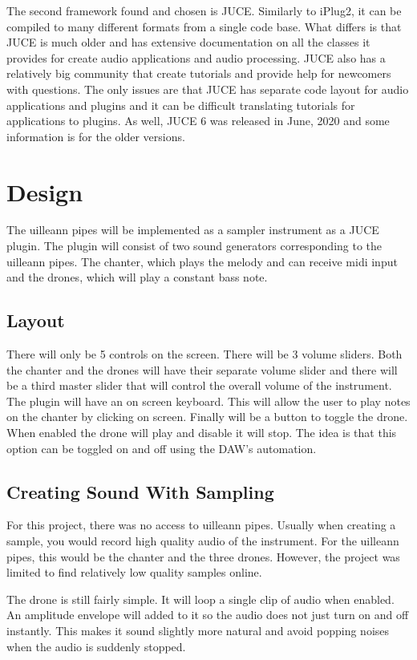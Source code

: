 \documentclass[12pt]{article}
\begin{document}
	The second framework found and chosen is JUCE. Similarly to iPlug2, it can be compiled to many different formats from a 
	single code base. What differs is that JUCE is much older and has extensive documentation on all the classes it provides
	for create audio applications and audio processing. JUCE also has a relatively big community that create tutorials and provide
	help for newcomers with questions. The only issues are that JUCE has separate code layout for audio applications and plugins
	and it can be difficult translating tutorials for applications to plugins. As well, JUCE 6 was released in June, 2020 and 
	some information is for the older versions.
	
		
\section{Design}
	The uilleann pipes will be implemented as a sampler instrument as a JUCE plugin. The plugin will consist of two sound 
	generators corresponding to the uilleann pipes. The chanter, which plays the melody and can receive midi input and the
	drones, which will play a constant bass note.
	
	\subsection{Layout}
	There will only be 5 controls on the screen. There will be 3 volume sliders. Both the chanter and the drones will have their
	separate volume slider and there will be a third master slider that will control the overall volume of the instrument.
	The plugin will have an on screen keyboard. This will allow the user to play notes on the chanter by clicking on screen.
	Finally will be a button to toggle the drone. When enabled the drone will play and disable it will stop. The idea is that
	this option can be toggled on and off using the DAW's automation.
	
	\subsection{Creating Sound With Sampling}		
	For this project, there was no access to uilleann pipes. Usually when creating a sample, you would record high quality audio
	of the instrument. For the uilleann pipes, this would be the chanter and the three drones. However, the project was limited to
	find relatively low quality samples online.
	
	The drone is still fairly simple. It will loop a single clip of audio when enabled. An amplitude envelope will added to it so
	the audio does not just turn on and off instantly. This makes it sound slightly more natural and avoid popping noises when 
	the audio is suddenly stopped.
	
\end{document}
